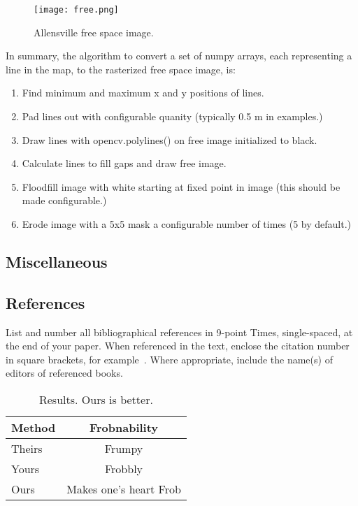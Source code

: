 \documentclass[10pt,twocolumn,letterpaper]{article}
\begin{document}
\begin{centering}
\begin{figure}[ht]
\caption{Allensville free space image.}
\centering
\texttt{[image: free.png]}
\label{fig:free}
\end{figure}
\end{centering}

In summary, the algorithm to convert a set of numpy arrays, each
representing a line in the map, to the rasterized free space image,
is:

\begin{enumerate}
\item Find minimum and maximum x and y positions of lines.
\item Pad lines out with configurable quanity (typically 0.5 m in examples.)
\item Draw lines with opencv.polylines() on free image initialized to black.
\item Calculate lines to fill gaps and draw free image.
\item Floodfill image with white starting at fixed point in image (this should be made configurable.)
\item Erode image with a 5x5 mask a configurable number of times (5 by default.)
\end{enumerate}

\subsection{Miscellaneous}


\subsection{References}

List and number all bibliographical references in 9-point Times,
single-spaced, at the end of your paper. When referenced in the text,
enclose the citation number in square brackets, for
example~\cite{Authors06}.  Where appropriate, include the name(s) of
editors of referenced books.

\begin{table}
\begin{center}
\begin{tabular}{|l|c|}
\hline
Method & Frobnability \\
\hline\hline
Theirs & Frumpy \\
Yours & Frobbly \\
Ours & Makes one's heart Frob\\
\hline
\end{tabular}
\end{center}
\caption{Results.   Ours is better.}
\end{table}
\end{document}
